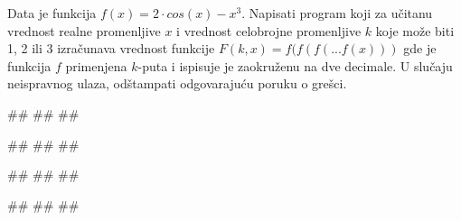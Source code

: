 \begin{Exercise}[label=p1.2_12] 
Data je funkcija $f(x) = 2 \cdot cos(x) - x^3$. Napisati program koji za učitanu vrednost realne promenljive $x$ i vrednost celobrojne promenljive $k$ koje može biti 1, 2 ili 3 izračunava
vrednost funkcije $F(k, x) = f(f(f(...f(x)))$ gde je funkcija $f$ primenjena $k$-puta i ispisuje je zaokruženu na dve decimale.
U slučaju neispravnog ulaza, odštampati odgovarajuću poruku o grešci.
\begin{miditest}
\begin{upotreba}{1}
#\naslovInt#
##
##
\end{upotreba}
\end{miditest}
\begin{miditest}
\begin{upotreba}{2}
#\naslovInt#
##
##
\end{upotreba}
\end{miditest}

\begin{miditest}
\begin{upotreba}{3}
#\naslovInt#
##
##
\end{upotreba}
\end{miditest}
\begin{miditest}
\begin{upotreba}{4}
#\naslovInt#
##
##
\end{upotreba}
\end{miditest}

\end{Exercise}
\ifresenja
 \begin{Answer}[ref=p1.2_12]
\end{Answer}
\fi





